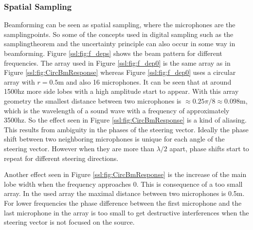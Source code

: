 \subsubsection{Spatial Sampling}
\label{sec:spatSam}
Beamforming can be seen as spatial sampling, where the microphones
are the samplingpoints.
So some of the concepts used in digital sampling such as 
the samplingtheorem and the uncertainty principle can also 
occur in some way in beamforming.
Figure \ref{ssl:fig:f_deps} shows the beam pattern for different frequencies.
The array used in Figure \ref{ssl:fig:f_dep0} is the same array
as in Figure \ref*{ssl:fig:CircBmResponse} whereas Figure \ref{ssl:fig:f_dep0}
uses a circular array with $r = 0.5$m and also 16 microphones. 
It can be seen that at around 1500hz more side lobes with a 
high amplitude start to appear. 
With this array geometry the smallest distance between two 
microphones is $\approx 0.25 \pi/8 \approx 0.098$m, which is the wavelength
of a sound wave with a frequency of approximately 3500hz.
So the effect seen in Figure \ref*{ssl:fig:CircBmResponse} is 
a kind of aliasing.
This results from ambiguity in the phases of the steering vector.
Ideally the phase shift between two neighboring microphones is unique
for each angle of the steering vector. 
However when they are more than $\lambda/2$ apart, phase shifts start to 
repeat for different steering directions.

Another effect seen in Figure \ref*{ssl:fig:CircBmResponse} is the increase
of the main lobe width when the frequency approaches 0.
This is consequence of a too small array. 
In the used array the maximal distance between two microphones is 0.5m.
For lower frequencies the phase difference between the first microphone and 
the last microphone in the array is too small to get destructive
interferences when the steering vector is not focused on the source.


